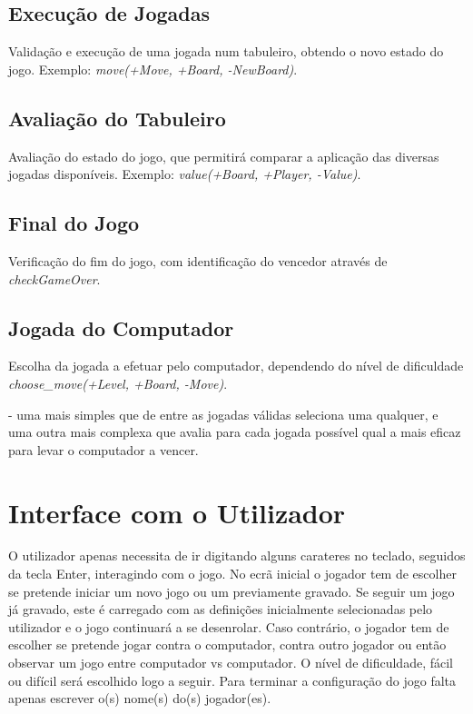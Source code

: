 \documentclass[a4paper]{article}
\begin{document}
\subsection{Execução de Jogadas} Validação e execução de uma jogada num tabuleiro, obtendo o novo estado do jogo. Exemplo: \textit{move(+Move, +Board, -NewBoard)}.

\subsection{Avaliação do Tabuleiro} Avaliação do estado do jogo, que permitirá comparar a aplicação das diversas jogadas disponíveis. Exemplo: \textit{value(+Board, +Player, -Value)}.

\subsection{Final do Jogo} Verificação do fim do jogo, com identificação do vencedor através de \textit{checkGameOver}.

\subsection{Jogada do Computador} Escolha da jogada a efetuar pelo computador, dependendo do nível de dificuldade \textit{choose\_move(+Level, +Board, -Move)}.

- uma mais simples que de entre as jogadas válidas seleciona uma qualquer, e uma outra mais complexa que avalia para cada jogada possível qual a mais eficaz para levar o computador a vencer.

\section{Interface com o Utilizador}

O utilizador apenas necessita de ir digitando alguns carateres no teclado, seguidos da tecla Enter, interagindo com o jogo.
No ecrã inicial o jogador tem de escolher se pretende iniciar um novo jogo ou um previamente gravado. Se seguir um jogo já gravado, este é carregado com as definições inicialmente selecionadas pelo utilizador e o jogo continuará a se desenrolar. Caso contrário, o jogador tem de escolher se pretende jogar contra o computador, contra outro jogador ou então observar um jogo entre computador vs computador. 
O nível de dificuldade, fácil ou difícil será escolhido logo a seguir.
Para terminar a configuração do jogo falta apenas escrever o(s) nome(s) do(s) jogador(es).
\end{document}
